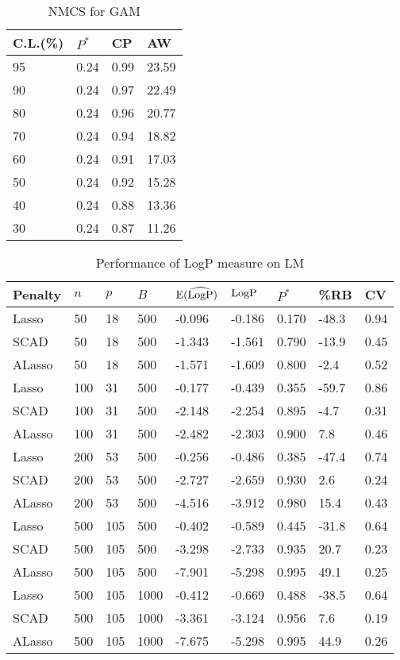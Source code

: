 \documentclass[10pt]{book}
\theoremstyle{definition}
\begin{document}
\begin{table}[!htbp]
\centering
\caption{NMCS for GAM}
\label{gam}
{\footnotesize
\begin{tabular}{|llll|}
\hline
C.L.(\%) & $P^*$   & CP   & AW    \\\hline
95 & 0.24 & 0.99 & 23.59 \\
90 & 0.24 & 0.97 & 22.49 \\
80 & 0.24 & 0.96 & 20.77 \\
70 & 0.24 & 0.94 & 18.82 \\
60 & 0.24 & 0.91 & 17.03 \\
50 & 0.24 & 0.92 & 15.28 \\
40 & 0.24 & 0.88 & 13.36 \\
30 & 0.24 & 0.87 & 11.26 \\\hline
\end{tabular}}
\end{table}
\begin{table}[!htbp]
\centering
\caption{Performance of LogP measure on LM}
\label{logp}
{\footnotesize
\begin{tabular}{|lllllllll|}
\hline
Penalty & $n$   & $p$   & $B$    & ${\rm E}(\widehat{\rm LogP})$ & ${\rm LogP}$  & $P^{*}$ & \%RB    & CV    \\ \hline
Lasso   & 50  & 18  & 500  & -0.096  & -0.186 & 0.170      & -48.3 & 0.94 \\
SCAD    & 50  & 18  & 500  & -1.343  & -1.561 & 0.790     & -13.9 & 0.45 \\
ALasso & 50  & 18  & 500  & -1.571  & -1.609 & 0.800     & -2.4  & 0.52 \\
Lasso   & 100 & 31  & 500  & -0.177  & -0.439 & 0.355     & -59.7 & 0.86 \\
SCAD    & 100 & 31  & 500  & -2.148  & -2.254 & 0.895     & -4.7  & 0.31 \\
ALasso & 100 & 31  & 500  & -2.482  & -2.303 & 0.900     & 7.8   & 0.46 \\
Lasso   & 200 & 53  & 500  & -0.256  & -0.486 & 0.385     & -47.4 & 0.74 \\
SCAD    & 200 & 53  & 500  & -2.727  & -2.659 & 0.930     & 2.6   & 0.24 \\
ALasso & 200 & 53  & 500  & -4.516  & -3.912 & 0.980     & 15.4  & 0.43 \\
Lasso   & 500 & 105 & 500  & -0.402  & -0.589 & 0.445     & -31.8 & 0.64 \\
SCAD    & 500 & 105 & 500  & -3.298  & -2.733 & 0.935     & 20.7  & 0.23 \\
ALasso & 500 & 105 & 500  & -7.901  & -5.298 & 0.995      & 49.1  & 0.25 \\
Lasso   & 500 & 105 & 1000 & -0.412  & -0.669 & 0.488      & -38.5 & 0.64 \\
SCAD    & 500 & 105 & 1000 & -3.361  & -3.124 & 0.956      & 7.6   & 0.19 \\
ALasso & 500 & 105 & 1000 & -7.675  & -5.298 & 0.995      & 44.9  & 0.26 \\ \hline
\end{tabular}}
\end{table}
\end{document}
